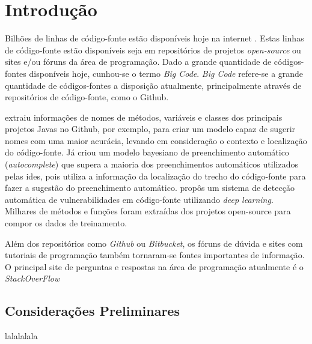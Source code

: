 \chapter{Introdução}
\label{cap:introducao}

Bilhões de linhas de código-fonte estão disponíveis hoje na internet \cite{iyer-etal-2016-summarizing}. Estas linhas de código-fonte estão disponíveis seja em repositórios de projetos \textit{open-source} ou sites e/ou fóruns da área de programação. Dado a grande quantidade de códigos-fontes disponíveis hoje, cunhou-se o termo \textit{Big Code}. \textit{Big Code} refere-se a grande quantidade de códigos-fontes a disposição atualmente, principalmente através de repositórios de código-fonte, como o Github. 

\cite{Allamanis-method-class-names:2015} extraiu informações de nomes de métodos, variáveis e classes dos principais projetos Javas no Github, por exemplo, para criar um \gls{modelo} capaz de sugerir nomes com uma maior acurácia, levando em consideração o contexto e localização do código-fonte. Já \cite{Proksch:2015} criou um modelo bayesiano de preenchimento automático (\textit{autocomplete}) que supera a maioria dos preenchimentos automáticos utilizados pelas \acrshort{ide}s, pois utiliza a informação da localização do trecho do código-fonte para fazer a sugestão do preenchimento automático. \cite{rebecca-2018} propôs um sistema de detecção automática de vulnerabilidades em código-fonte utilizando \textit{deep learning}. Milhares de métodos e funções foram extraídas dos projetos open-source para compor os dados de treinamento.

Além dos repositórios como \textit{Github} ou \textit{Bitbucket}, os fóruns de dúvida e sites com tutoriais de programação também tornaram-se fontes importantes de informação. O principal site de perguntas e respostas na área de programação atualmente é o \textit{StackOverFlow}



\section{Considerações Preliminares}
\label{sec:consideracoes_preliminares}

lalalalala



